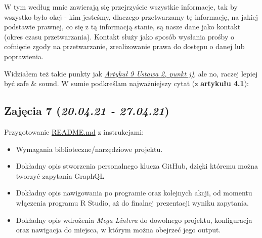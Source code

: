 \documentclass[graybox]{svmult}
\begin{document}

W tym według mnie zawierają się przejrzyście wszystkie informacje, tak by wszystko było okej - kim jesteśmy, dlaczego przetwarzamy tę informację, na jakiej podstawie prawnej, co się z tą informacją stanie, są nasze dane jako kontakt (okres czasu przetwarzania). Kontakt służy jako sposób wysłania prośby o cofnięcie zgody na przetwarzanie, zrealizowanie prawa do dostępu o danej lub poprawienia. 

Widziałem też takie punkty jak \hyperlink{https://gdpr.pl/baza-wiedzy/akty-prawne/interaktywny-tekst-gdpr/artykul-9-przetwarzanie-szczegolnych-kategorii-danych-osobowych}{\emph{Artykuł 9 Ustawa 2, punkt j)}}, ale no, raczej lepiej być safe \& sound. W sumie podkreślam najważniejszy cytat (z \textbf{artykułu 4.1}):


\subsection{Zajęcia 7 (\emph{20.04.21 - 27.04.21})}

Przygotowanie \href{https://github.com/pwr-pbr21/M1/commit/34a82a756464be4957f9512095e1a7ced9c700f6}{README.md} z instrukcjami:

\begin{itemize}
  \item Wymagania biblioteczne/narzędziowe projektu.
  \item Dokładny opis stworzenia personalnego klucza GitHub, dzięki któremu można tworzyć zapytania GraphQL
  \item Dokładny opis nawigowania po programie oraz kolejnych akcji, od momentu włączenia programu R Studio, aż do finalnej prezentacji wyniku zapytania.
  \item Dokładny opis wdrożenia \emph{Mega Lintera} do dowolnego projektu, konfiguracja oraz nawigacja do miejsca, w którym można obejrzeć jego output.
\end{itemize}
\end{document}
